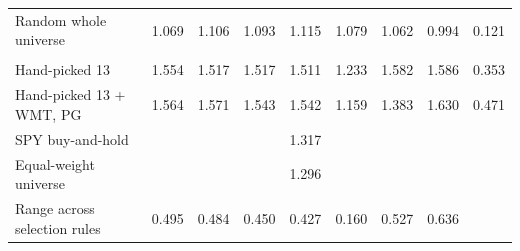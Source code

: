 \begin{table}[H]
\begin{tabular}{l*{8}{r}}
Random whole universe & 1.069 & 1.106 & 1.093 & 1.115 & 1.079 & 1.062 & 0.994 & 0.121 \\
\addlinespace
\multicolumn{9}{l}{\emph{Hand-picked}} \\
Hand-picked 13 & 1.554 & 1.517 & 1.517 & 1.511 & 1.233 & 1.582 & 1.586 & 0.353 \\
Hand-picked 13 + WMT, PG & 1.564 & 1.571 & 1.543 & 1.542 & 1.159 & 1.383 & 1.630 & 0.471 \\
\midrule
SPY buy-and-hold & \multicolumn{7}{c}{1.317} & \\
Equal-weight universe & \multicolumn{7}{c}{1.296} & \\
\midrule
Range across selection rules & 0.495 & 0.484 & 0.450 & 0.427 & 0.160 & 0.527 & 0.636 & \\
\bottomrule
\end{tabular}
\end{table}

